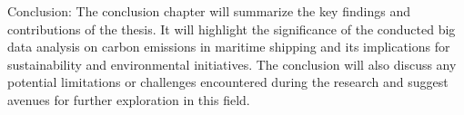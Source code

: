 \noindent Conclusion:
The conclusion chapter will summarize the key findings and contributions of the thesis.
It will highlight the significance of the conducted big data analysis on carbon emissions in maritime shipping and its implications for sustainability and environmental initiatives.
The conclusion will also discuss any potential limitations or challenges encountered during the research and suggest avenues for further exploration in this field.